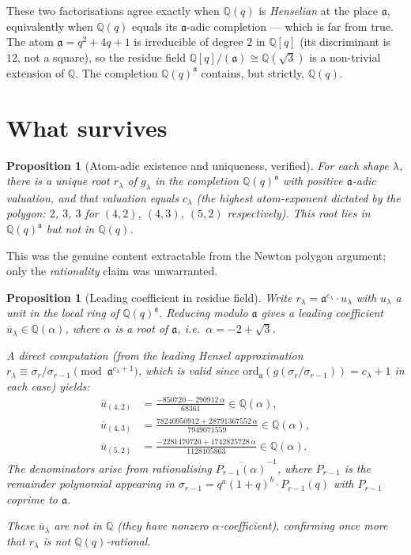 \documentclass[11pt]{article}
\newtheorem{proposition}[theorem]{Proposition}
\theoremstyle{remark}
\begin{document}
These two factorisations agree exactly when $\mathbb{Q}(q)$ is
\emph{Henselian} at the place $\mathfrak{a}$, equivalently when
$\mathbb{Q}(q)$ equals its $\mathfrak{a}$-adic completion --- which
is far from true. The atom $\mathfrak{a} = q^2+4q+1$ is irreducible of
degree $2$ in $\mathbb{Q}[q]$ (its discriminant is $12$, not a square),
so the residue field $\mathbb{Q}[q]/(\mathfrak{a}) \cong \mathbb{Q}(\sqrt{3})$
is a non-trivial extension of $\mathbb{Q}$. The completion
$\mathbb{Q}(q)^\mathfrak{a}$ contains, but strictly,
$\mathbb{Q}(q)$.

\section{What survives}

\begin{proposition}[Atom-adic existence and uniqueness, verified]
For each shape $\lambda$, there is a \emph{unique} root $r_\lambda$ of
$g_\lambda$ in the completion $\mathbb{Q}(q)^\mathfrak{a}$ with positive
$\mathfrak{a}$-adic valuation, and that valuation equals $c_\lambda$
(the highest atom-exponent dictated by the polygon: $2$, $3$, $3$ for
$(4,2)$, $(4,3)$, $(5,2)$ respectively). This root lies in
$\mathbb{Q}(q)^\mathfrak{a}$ but \emph{not} in $\mathbb{Q}(q)$.
\end{proposition}

This was the genuine content extractable from the Newton polygon
argument; only the \emph{rationality} claim was unwarranted.

\begin{proposition}[Leading coefficient in residue field]
Write $r_\lambda = \mathfrak{a}^{c_\lambda} \cdot u_\lambda$ with
$u_\lambda$ a unit in the local ring of $\mathbb{Q}(q)^\mathfrak{a}$.
Reducing modulo $\mathfrak{a}$ gives a leading coefficient
$\overline{u}_\lambda \in \mathbb{Q}(\alpha)$, where $\alpha$ is a
root of $\mathfrak{a}$, i.e.\ $\alpha = -2 + \sqrt{3}$.

A direct computation (from the leading Hensel approximation
$r_\lambda \equiv \sigma_r/\sigma_{r-1} \pmod{\mathfrak{a}^{c_\lambda + 1}}$,
which is valid since $\mathrm{ord}_\mathfrak{a}(g(\sigma_r/\sigma_{r-1}))
= c_\lambda + 1$ in each case) yields:
\begin{align*}
\overline{u}_{(4,2)} &= \tfrac{-850720 - 290912\,\alpha}{68361}
  \in \mathbb{Q}(\alpha),\\
\overline{u}_{(4,3)} &= \tfrac{78240950912 + 28791367552\,\alpha}{7949071559}
  \in \mathbb{Q}(\alpha),\\
\overline{u}_{(5,2)} &= \tfrac{-2281470720 + 1742825728\,\alpha}{1128105863}
  \in \mathbb{Q}(\alpha).
\end{align*}
The denominators arise from rationalising
$\overline{P_{r-1}(\alpha)}^{-1}$, where $P_{r-1}$ is the
remainder polynomial appearing in $\sigma_{r-1} = q^a (1+q)^b \cdot
P_{r-1}(q)$ with $P_{r-1}$ coprime to $\mathfrak{a}$.

These $\overline{u}_\lambda$ are not in $\mathbb{Q}$ (they have nonzero
$\alpha$-coefficient), confirming once more that $r_\lambda$ is not
$\mathbb{Q}(q)$-rational.
\end{proposition}
\end{document}
